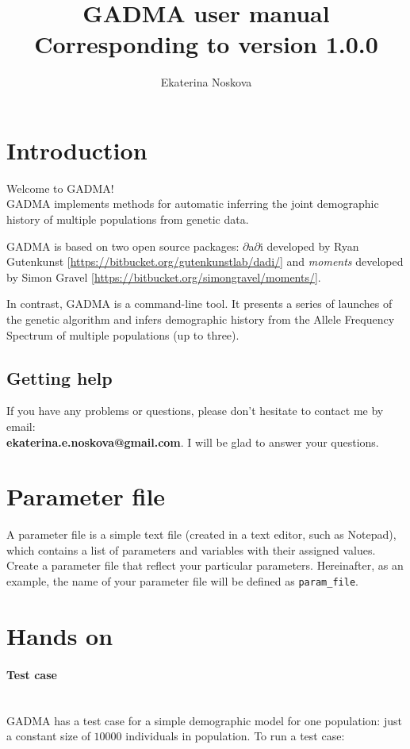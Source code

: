 \documentclass[12pt]{article}
\title{GADMA user manual \\ \normalsize  Corresponding to version 1.0.0}
\author{Ekaterina Noskova}
\date{}
\makeatletter
\newcommand{\dadi}{$\partial$a$\partial$i\xspace}
\newcommand{\moments}{\textit{moments}\xspace}
\newcommand{\py}[1]{\lstinline[language=Python, showstringspaces=False]@#1@}
\makeatother
\begin{document}
\maketitle
\tableofcontents
\clearpage


\section{Introduction}
Welcome to GADMA!\\

GADMA implements methods for automatic inferring the joint demographic history of multiple populations from genetic data.

GADMA is based on two open source packages: \dadi developed by Ryan Gutenkunst [\url{https://bitbucket.org/gutenkunstlab/dadi/}] and \moments developed by Simon Gravel [\url{https://bitbucket.org/simongravel/moments/}].

In contrast, GADMA is a command-line tool. It presents a series of launches of the genetic algorithm and infers demographic history from the Allele Frequency Spectrum of multiple populations (up to three).

\subsection{Getting help}
If you have any problems or questions, please don't hesitate to contact me by email:\\ \textbf{ekaterina.e.noskova@gmail.com}. I will be glad to answer your questions. 

\section{Parameter file}

A parameter file is a simple text file (created in a text editor, such as Notepad), which contains a list of parameters and variables with their assigned values. Create a parameter file that reflect your particular parameters. Hereinafter, as an example, the name of your parameter file will be defined as \py{param_file}.

\section{Hands on}

\paragraph{Test case}\mbox{}\\
GADMA has a test case for a simple demographic model for one population: just a constant size of $10000$ individuals in population. To run a test case:
\end{document}
